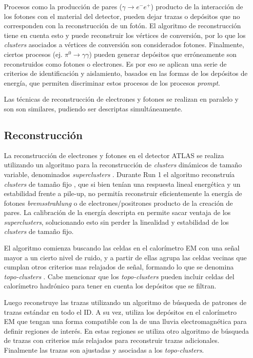 Procesos como la producción de pares ($\gamma\to e^{-}e^{+}$) producto de la interacción de los fotones con el material del detector, pueden dejar trazas o depósitos que no corresponden con la reconstrucción de un fotón. El algoritmo de reconstrucción tiene en cuenta esto y puede reconstruir los vértices de conversión, por lo que los \textit{clusters} asociados a vértices de conversión son considerados fotones. Finalmente, ciertos procesos (ej. $\pi^{0}\to\gamma\gamma$) pueden generar depósitos que erróneamente son reconstruidos como fotones o electrones. Es por eso se aplican una serie de criterios de identificación y aislamiento, basados en las formas de los depósitos de energía, que permiten discriminar estos procesos de los procesos \textit{prompt}. 

Las técnicas de reconstrucción de electrones y fotones se realizan en paralelo y son son similares, pudiendo ser
descriptas simultáneamente.

\subsection{Reconstrucción}


La reconstrucción de electrones y fotones en el detector ATLAS se realiza utilizando un algoritmo para la reconstrucción de \textit{clusters} dinámicos de tamaño variable, denominados \textit{superclusters} \cite{EGAM-2018-01}. Durante Run 1 el algoritmo reconstruía \textit{clusters} de tamaño fijo \cite{PERF-2013-04, PERF-2013-05, ATL-LARG-PUB-2008-002}, que si bien tenían una respuesta lineal energética y un estabilidad frente a pile-up, no permitía reconstruir eficientemente la energía de fotones \textit{bremsstrahlung} o de electrones/positrones producto de la creación de pares. La calibración de la energía descripta en \cite{PERF-2017-03} permite sacar ventaja de los \textit{superclusters}, solucionando esto sin perder la linealidad y estabilidad de los \textit{clusters} de tamaño fijo.

El algoritmo comienza buscando las celdas en el calorímetro EM con una señal mayor a un cierto nivel de ruido, y a partir de ellas agrupa las celdas vecinas que cumplan otros criterios mas relajados de señal, formando lo que se denomina \textit{topo-clusters} \cite{PERF-2014-07, ATL-LARG-PUB-2008-002}. Cabe mencionar que los \textit{topo-clusters} pueden incluir celdas del calorímetro hadrónico para tener en cuenta los depósitos que se filtran. 

Luego reconstruye las trazas utilizando un algoritmo de búsqueda de patrones de trazas estándar \cite{ATL-SOFT-PUB-2007-007} en todo el ID. A su vez, utiliza los depósitos en el calorímetro EM que tengan una forma compatible con la de una lluvia electromagnética  para definir regiones de interés. En estas regiones se utiliza otro algoritmo de búsqueda de trazas con criterios más relajados \cite{Kalman} para reconstruir trazas adicionales. Finalmente las trazas son ajustadas y asociadas a los \textit{topo-clusters}. 

